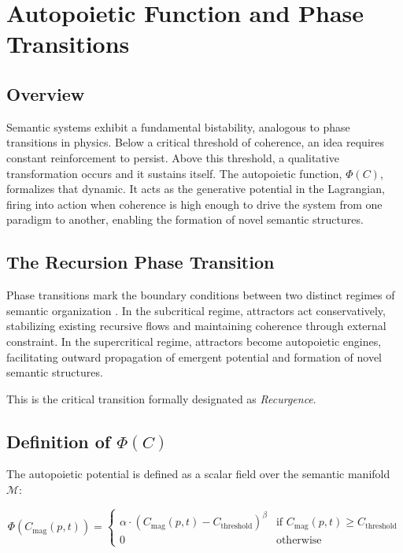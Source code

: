 \chapter{Autopoietic Function and Phase Transitions}

\section{Overview}

Semantic systems exhibit a fundamental bistability, analogous to phase transitions in physics. Below a critical threshold of coherence, an idea requires constant reinforcement to persist. Above this threshold, a qualitative transformation occurs and it sustains itself. The autopoietic function, \(\Phi(C)\), formalizes that dynamic. It acts as the generative potential in the Lagrangian, firing into action when coherence is high enough to drive the system from one paradigm to another, enabling the formation of novel semantic structures.

\section{The Recursion Phase Transition}

Phase transitions mark the boundary conditions between two distinct regimes of semantic organization \autocite{Landau1937, Stanley1971}. In the subcritical regime, attractors act conservatively, stabilizing existing recursive flows and maintaining coherence through external constraint. In the supercritical regime, attractors become autopoietic engines, facilitating outward propagation of emergent potential and formation of novel semantic structures.

This is the critical transition formally designated as \textit{Recurgence}.

\section[Definition of Phi(C)]{Definition of \(\Phi(C)\)}

The autopoietic potential is defined as a scalar field over the semantic manifold \(\mathcal{M}\):

\begin{equation}
\Phi(C_{\mathrm{mag}}(p,t)) =
\begin{cases}
\alpha \cdot (C_{\mathrm{mag}}(p,t) - C_{\text{threshold}})^{\beta} & \text{if } C_{\mathrm{mag}}(p,t) \geq C_{\text{threshold}} \\
0 & \text{otherwise}
\end{cases}
\end{equation}

